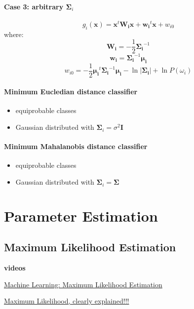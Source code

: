 \documentclass{report}
\begin{document}
\subsubsection*{Case 3: arbitrary $\symbf{\Sigma}_i$}
\[g_i(\symbf{x}) = \symbf{x}^t \symbf{W_i} \symbf{x} + \symbf{w_i}^t \symbf{x} + w_{i0}\]
where:
\[\symbf{W_i} = -\frac{1}{2}\symbf{\Sigma_i}^{-1}\]
\[\symbf{w_i} = \symbf{\Sigma_i}^{-1} \symbf{\mu_i}\]
\[w_{i0} = -\frac{1}{2}\symbf{\mu_i}^t \symbf{\Sigma_i}^{-1} \symbf{\mu_i} - \ln |\symbf{\Sigma_i}| + \ln P(\omega_i) \]

\subsubsection*{Minimum Eucledian distance classifier}
\begin{itemize}
	\item equiprobable classes
	\item Gaussian distributed with $\symbf{\Sigma}_i = \sigma^2 \symbf{I}$
\end{itemize}

\subsubsection*{Minimum Mahalanobis distance classifier}
\begin{itemize}
	\item equiprobable classes
	\item Gaussian distributed with $\symbf{\Sigma}_i = \symbf{\Sigma}$
\end{itemize}


\chapter{Parameter Estimation}

\section{Maximum Likelihood Estimation}
\begin{mdframed}
	\textbf{videos}

	\href{https://www.youtube.com/watch?v=sguol03tfWo&list=PL5yR0euE9N2kGEf7gqysMFq0Spoq0evNf&index=2}{Machine Learning: Maximum Likelihood Estimation}

	\href{https://www.youtube.com/watch?v=XepXtl9YKwc}{Maximum Likelihood, clearly explained!!!}
\end{mdframed}
\end{document}
